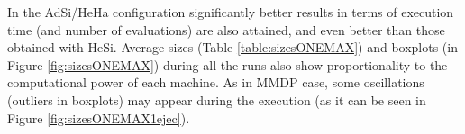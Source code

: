 \documentclass[final,1p,times]{elsarticle}
\begin{document}








In the AdSi/HeHa configuration significantly better results in terms of execution time (and number of evaluations) are also attained, and even better than those obtained with HeSi. Average sizes (Table \ref{table:sizesONEMAX}) and boxplots (in Figure \ref{fig:sizesONEMAX}) during all the runs also show proportionality to the computational power of each machine. As in MMDP case, some oscillations (outliers in boxplots) may appear during the execution (as it can be seen in Figure \ref{fig:sizesONEMAX1ejec}).



\begin{table}
\end{table}
\end{document}
